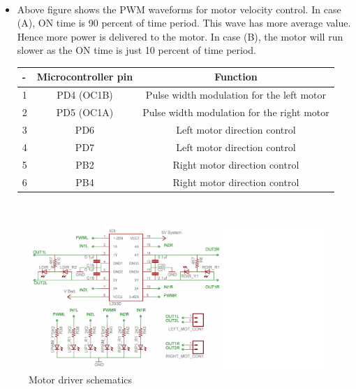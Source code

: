 \documentclass[a4paper,12pt,oneside]{book}
\begin{document}
	\hfill\\
	\begin{itemize}
	\item {Above figure shows the PWM waveforms for motor velocity control. In case (A), ON time is 90 percent of time period. This wave has more average value. Hence more power is delivered to the
	motor. In case (B), the motor will run slower as the ON time is just 10 percent of time period.}

	\begin{tabular*}{\textwidth}{|l|c|c|}
	\hline
	- & Microcontroller pin & Function \\
	\hline
	1 & PD4 (OC1B) & Pulse width modulation for the left motor\\
	\hline
	2 & PD5 (OC1A) & Pulse width modulation for the right motor\\
	\hline
	3 & PD6 & Left motor direction control \\
	\hline
	4 & PD7 & Left motor direction control \\
	\hline
	5 & PB2 & Right motor direction control \\
	\hline
	6 & PB4 & Right motor direction control \\
	\hline
	\end{tabular*}

	\end{itemize}
	\newpage
	\hfill\\
	\begin{figure}[h!]
		\caption{Motor driver schematics}
		\includegraphics[width=\textwidth]{./HardwareManual/l293d.png}
	\end{figure}
	\hfill\\
\end{document}
